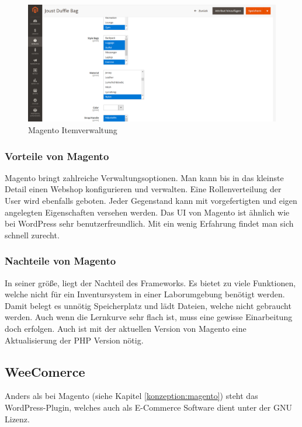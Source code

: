 \begin{figure}[bh]
	\centering
	\includegraphics[scale=0.35]{content/pictures/magento.png}
	\caption{Magento Itemverwaltung}
	\label{fig:magento}
\end{figure}

\subsubsection{Vorteile von Magento}
Magento bringt zahlreiche Verwaltungsoptionen. Man kann bis in das kleinste Detail einen Webshop konfigurieren und verwalten. Eine Rollenverteilung der User wird ebenfalls geboten. Jeder Gegenstand kann mit vorgefertigten und eigen angelegten Eigenschaften versehen werden. Das \ac{UI} von Magento ist ähnlich wie bei WordPress sehr benutzerfreundlich. Mit ein wenig Erfahrung findet man sich schnell zurecht. \autocite{Koch.2012}

\subsubsection{Nachteile von Magento}
In seiner größe, liegt der Nachteil des Frameworks. Es bietet zu viele Funktionen, welche nicht für ein Inventursystem in einer Laborumgebung benötigt werden. Damit belegt es unnötig Speicherplatz und lädt Dateien, welche nicht gebraucht werden. Auch wenn die Lernkurve sehr flach ist, muss eine gewisse Einarbeitung doch erfolgen. Auch ist mit der aktuellen Version von Magento eine Aktualisierung der \ac{PHP} Version nötig. \autocite{Koch.2012}

\subsection{WeeComerce}
Anders als bei Magento (siehe Kapitel \ref{konzeption:magento}) steht das WordPress-Plugin, welches auch als E-Commerce Software dient unter der \ac{GNU} Lizenz. 

